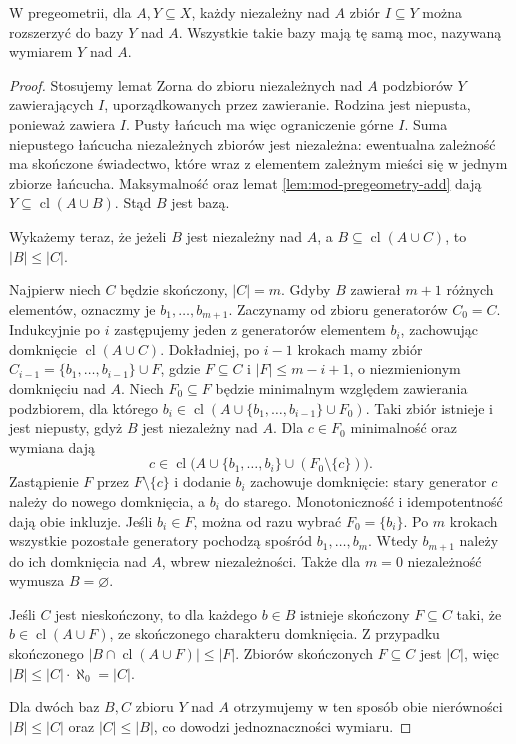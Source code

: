 \begin{twierdzenie}
\label{thm:mod-pregeometry-bases}
W pregeometrii, dla $A,Y\subseteq X$, każdy
niezależny nad $A$ zbiór $I\subseteq Y$
można rozszerzyć do bazy $Y$ nad $A$.
Wszystkie takie bazy mają tę samą
moc, nazywaną wymiarem $Y$ nad $A$.
\end{twierdzenie}
\begin{proof}
Stosujemy lemat Zorna do zbioru niezależnych
nad $A$ podzbiorów $Y$ zawierających $I$,
uporządkowanych przez zawieranie. Rodzina jest
niepusta, ponieważ zawiera $I$. Pusty łańcuch
ma więc ograniczenie górne $I$.
Suma niepustego łańcucha
niezależnych zbiorów jest niezależna:
ewentualna zależność ma skończone świadectwo,
które wraz z elementem zależnym mieści się
w jednym zbiorze łańcucha.
Maksymalność oraz lemat \ref{lem:mod-pregeometry-add}
dają $Y\subseteq\operatorname{cl}(A\cup B)$.
Stąd $B$ jest bazą.

Wykażemy teraz, że jeżeli $B$ jest niezależny
nad $A$, a $B\subseteq\operatorname{cl}(A\cup C)$,
to $|B|\leq |C|$.

Najpierw niech $C$ będzie skończony, $|C|=m$.
Gdyby $B$ zawierał $m+1$ różnych elementów,
oznaczmy je $b_1,\ldots,b_{m+1}$.
Zaczynamy od zbioru generatorów $C_0=C$.
Indukcyjnie po $i$ zastępujemy jeden z generatorów
elementem $b_i$, zachowując domknięcie
$\operatorname{cl}(A\cup C)$.
Dokładniej, po $i-1$ krokach mamy zbiór
$C_{i-1}=\{b_1,\ldots,b_{i-1}\}\cup F$,
gdzie $F\subseteq C$ i $|F|\leq m-i+1$,
o niezmienionym domknięciu nad $A$.
Niech $F_0\subseteq F$ będzie minimalnym
względem zawierania podzbiorem, dla którego
$b_i\in\operatorname{cl}(A\cup
\{b_1,\ldots,b_{i-1}\}\cup F_0)$.
Taki zbiór istnieje i jest niepusty,
gdyż $B$ jest niezależny nad $A$.
Dla $c\in F_0$ minimalność oraz wymiana
dają
\[
c\in\operatorname{cl}\bigl(A\cup
\{b_1,\ldots,b_i\}\cup(F_0\setminus\{c\})\bigr).
\]
Zastąpienie $F$ przez $F\setminus\{c\}$
i dodanie $b_i$ zachowuje domknięcie:
stary generator $c$ należy do nowego
domknięcia, a $b_i$ do starego.
Monotoniczność i idempotentność dają
obie inkluzje. Jeśli $b_i\in F$,
można od razu wybrać $F_0=\{b_i\}$.
Po $m$ krokach wszystkie pozostałe generatory
pochodzą spośród $b_1,\ldots,b_m$.
Wtedy $b_{m+1}$ należy do ich domknięcia
nad $A$, wbrew niezależności.
Także dla $m=0$ niezależność wymusza $B=\varnothing$.

Jeśli $C$ jest nieskończony, to dla każdego
$b\in B$ istnieje skończony $F\subseteq C$
taki, że $b\in\operatorname{cl}(A\cup F)$,
ze skończonego charakteru domknięcia.
Z przypadku skończonego
$|B\cap\operatorname{cl}(A\cup F)|\leq|F|$.
Zbiorów skończonych $F\subseteq C$ jest $|C|$,
więc $|B|\leq |C|\cdot\aleph_0=|C|$.

Dla dwóch baz $B,C$ zbioru $Y$ nad $A$
otrzymujemy w ten sposób obie nierówności
$|B|\leq|C|$ oraz $|C|\leq|B|$,
co dowodzi jednoznaczności wymiaru.
\end{proof}

